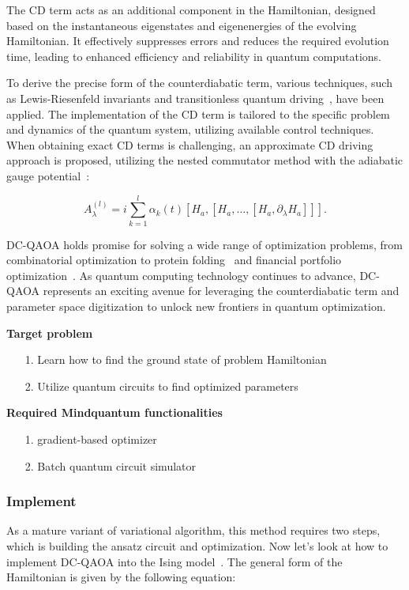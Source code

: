 The CD term acts as an additional component in the Hamiltonian, designed based on the instantaneous eigenstates and eigenenergies of the evolving Hamiltonian. It effectively suppresses errors and reduces the required evolution time, leading to enhanced efficiency and reliability in quantum computations.

To derive the precise form of the counterdiabatic term, various techniques, such as Lewis-Riesenfeld invariants and transitionless quantum driving~\cite{PhysRevA.83.062116}, have been applied. The implementation of the CD term is tailored to the specific problem and dynamics of the quantum system, utilizing available control techniques. When obtaining exact CD terms is challenging, an approximate CD driving approach is proposed, utilizing the nested commutator method  with the adiabatic gauge potential~\cite{PhysRevResearch.4.013141}:

\begin{equation}
    A_{\lambda}^{(l)} = i \sum_{k=1}^{l} \alpha_{k}(t) [H_{a}, [H_{a}, \ldots, [H_{a}, \partial_{\lambda} H_{a}]]].
\end{equation}

DC-QAOA holds promise for solving a wide range of optimization problems, from combinatorial optimization to protein folding~\cite{PhysRevApplied.20.014024} and financial portfolio optimization~\cite{PhysRevResearch.4.043204}. As quantum computing technology continues to advance, DC-QAOA represents an exciting avenue for leveraging the counterdiabatic term and parameter space digitization to unlock new frontiers in quantum optimization.

\textbf{Target problem}
\begin{itemize}
    \item[1.] Learn how to find the ground state of problem Hamiltonian
    \item[2.] Utilize quantum circuits to find optimized parameters
\end{itemize}
\textbf{Required Mindquantum functionalities}
\begin{itemize}
    \item[1.] gradient-based optimizer
    \item[2.] Batch quantum circuit simulator

\end{itemize}

\subsubsection{Implement}
As a mature variant of variational algorithm, this method requires two steps, which is building the ansatz circuit and optimization. Now let's look at how to implement DC-QAOA into the Ising model~\cite{PhysRevResearch.4.013141}. The general form of the Hamiltonian is given by the following equation:

